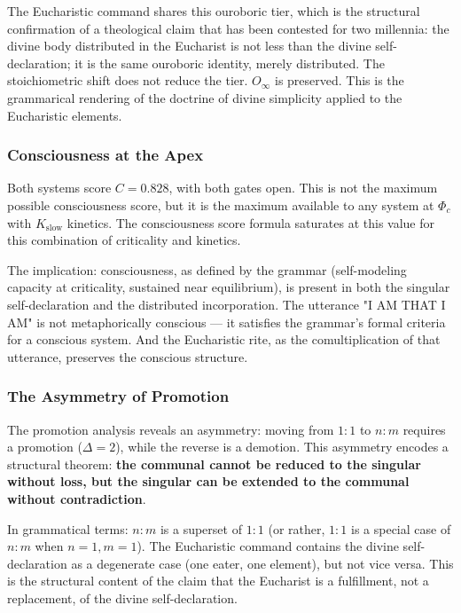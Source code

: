 \documentclass[12pt,a4paper]{article}
\begin{document}
The Eucharistic command shares this ouroboric tier, which is the structural confirmation of a theological claim that has been contested for two millennia: the divine body distributed in the Eucharist is not less than the divine self-declaration; it is the same ouroboric identity, merely distributed. The stoichiometric shift does not reduce the tier. $O_{\infty}$ is preserved. This is the grammarical rendering of the doctrine of divine simplicity applied to the Eucharistic elements.

\subsubsection{Consciousness at the Apex}

Both systems score $C = 0.828$, with both gates open. This is not the maximum possible consciousness score, but it is the maximum available to any system at $\Phi_c$ with $K_{\text{slow}}$ kinetics. The consciousness score formula saturates at this value for this combination of criticality and kinetics.

The implication: consciousness, as defined by the grammar (self-modeling capacity at criticality, sustained near equilibrium), is present in both the singular self-declaration and the distributed incorporation. The utterance "I AM THAT I AM" is not metaphorically conscious --- it satisfies the grammar's formal criteria for a conscious system. And the Eucharistic rite, as the comultiplication of that utterance, preserves the conscious structure.

\subsubsection{The Asymmetry of Promotion}

The promotion analysis reveals an asymmetry: moving from $1{:}1$ to $n{:}m$ requires a promotion ($\Delta = 2$), while the reverse is a demotion. This asymmetry encodes a structural theorem: \textbf{the communal cannot be reduced to the singular without loss, but the singular can be extended to the communal without contradiction}.

In grammatical terms: $n{:}m$ is a superset of $1{:}1$ (or rather, $1{:}1$ is a special case of $n{:}m$ when $n=1, m=1$). The Eucharistic command contains the divine self-declaration as a degenerate case (one eater, one element), but not vice versa. This is the structural content of the claim that the Eucharist is a fulfillment, not a replacement, of the divine self-declaration.
\end{document}
